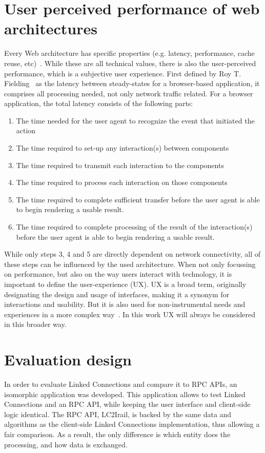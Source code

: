 \documentclass[twocolumn]{phdsymp} %
\begin{document}
\section{User perceived performance of web architectures}
Every Web architecture has specific properties (e.g. latency, performance, cache reuse, etc)~\cite{verborgh16}. While these are all technical values, there is also the user-perceived performance, which is a subjective user experience. First defined by Roy T. Fielding~\cite{fielding99} as the latency between steady-states for a browser-based application, it comprises all processing needed, not only network traffic related. For a browser application, the total latency consists of the following parts:
\begin{enumerate}
	\item The time needed for the user agent to recognize the event that initiated the action
	\item The time required to set-up any interaction(s) between components
	\item The time required to transmit each interaction to the components
	\item The time required to process each interaction on those components
	\item The time required to complete sufficient transfer before the user agent is able to begin rendering a usable result.
	\item The time required to complete processing of the result of the interaction(s) before the user agent is able to begin rendering a usable result.
\end{enumerate}

While only steps 3, 4 and 5 are directly dependent on network connectivity, all of these steps can be influenced by the used architecture. When not only focussing on performance, but also on the way users interact with technology, it is important to define the user-experience (UX). UX is a broad term, originally designating the design and usage of interfaces, making it a synonym for interactions and usability. But it is also used for non-instrumental needs and experiences in a more complex way~\cite{avila11}. In this work UX will always be considered in this broader way.

\section{Evaluation design}

In order to evaluate Linked Connections and compare it to RPC APIs, an isomorphic application was developed. This application allows to test Linked Connections and an RPC API, while keeping the user interface and client-side logic identical. The RPC API, LC2Irail, is backed by the same data and algorithms as the client-side Linked Connections implementation, thus allowing a fair comparison. As a result, the only difference is which entity does the processing, and how data is exchanged.
\end{document}
